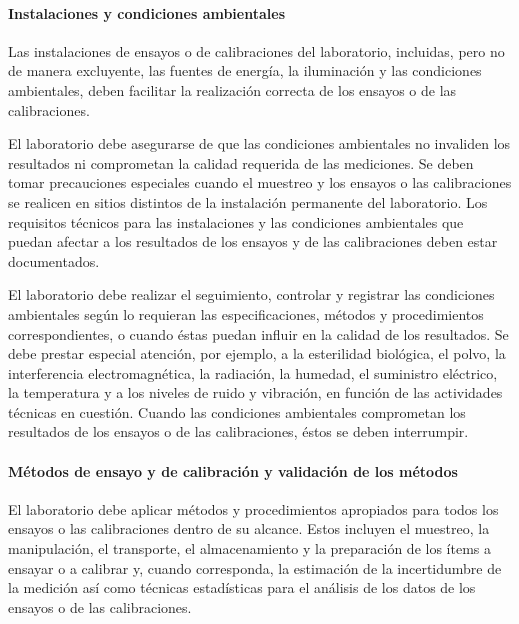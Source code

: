 \paragraph{Instalaciones y condiciones ambientales}
Las instalaciones de ensayos o de calibraciones del laboratorio, incluidas, pero no de manera
excluyente, las fuentes de energía, la iluminación y las condiciones ambientales, deben facilitar la realización
correcta de los ensayos o de las calibraciones.

\par \noindent
El laboratorio debe asegurarse de que las condiciones ambientales no invaliden los resultados ni
comprometan la calidad requerida de las mediciones. Se deben tomar precauciones especiales cuando el
muestreo y los ensayos o las calibraciones se realicen en sitios distintos de la instalación permanente del
laboratorio. Los requisitos técnicos para las instalaciones y las condiciones ambientales que puedan afectar a
los resultados de los ensayos y de las calibraciones deben estar documentados.

\par \noindent
El laboratorio debe realizar el seguimiento, controlar y registrar las condiciones ambientales según lo
requieran las especificaciones, métodos y procedimientos correspondientes, o cuando éstas puedan influir en
la calidad de los resultados. Se debe prestar especial atención, por ejemplo, a la esterilidad biológica, el polvo,
la interferencia electromagnética, la radiación, la humedad, el suministro eléctrico, la temperatura y a los
niveles de ruido y vibración, en función de las actividades técnicas en cuestión. Cuando las condiciones
ambientales comprometan los resultados de los ensayos o de las calibraciones, éstos se deben interrumpir.

\paragraph{Métodos de ensayo y de calibración y validación de los métodos}
\par 
El laboratorio debe aplicar métodos y procedimientos apropiados para todos los ensayos o las calibraciones
dentro de su alcance. Estos incluyen el muestreo, la manipulación, el transporte, el almacenamiento y la
preparación de los ítems a ensayar o a calibrar y, cuando corresponda, la estimación de la incertidumbre de
la medición así como técnicas estadísticas para el análisis de los datos de los ensayos o de las calibraciones.

